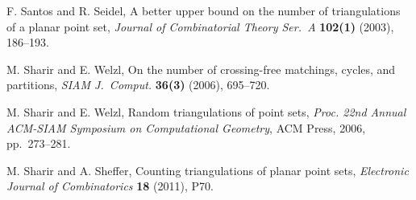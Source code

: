 \documentclass[11pt]{article}
\begin{document}
\begin{thebibliography}{99}
 F. Santos and R. Seidel,
A better upper bound on the number of triangulations of a planar point set,
{\em Journal of Combinatorial Theory Ser.\ A} {\bf 102(1)} (2003),
186--193.


 M. Sharir and E. Welzl,
On the number of crossing-free matchings, cycles, and partitions,
\emph{SIAM J.\ Comput.}
{\bf 36(3)} (2006), 695--720.

 M. Sharir and E. Welzl,
Random triangulations of point sets,
{\it Proc. 22nd Annual ACM-SIAM Symposium on Computational Geometry},
ACM Press, 2006, pp.~273--281.

M. Sharir and A. Sheffer,
Counting triangulations of planar point sets,
{\em Electronic Journal of Combinatorics} {\bf 18} (2011), P70.



\end{thebibliography}
\end{document}
